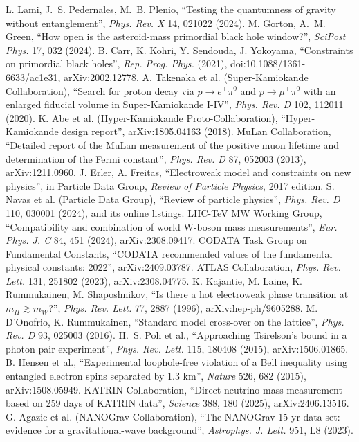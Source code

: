  L. Lami, J.~S. Pedernales, M.~B. Plenio, ``Testing the quantumness of gravity without entanglement'', \emph{Phys. Rev. X} 14,
021022 (2024).
 M. Gorton, A.~M. Green, ``How open is the asteroid-mass primordial black hole window?'', \emph{SciPost Phys.} 17, 032
(2024).
 B. Carr, K. Kohri, Y. Sendouda, J. Yokoyama, ``Constraints on primordial black holes'', \emph{Rep. Prog. Phys.} (2021),
doi:10.1088/1361-6633/ac1e31, arXiv:2002.12778.
 A. Takenaka et al. (Super-Kamiokande Collaboration), ``Search for proton decay via $p\to e^+\pi^0$ and $p\to\mu^+\pi^0$
with an enlarged fiducial volume in Super-Kamiokande I-IV'', \emph{Phys. Rev. D} 102, 112011 (2020).
 K. Abe et al. (Hyper-Kamiokande Proto-Collaboration), ``Hyper-Kamiokande design report'', arXiv:1805.04163 (2018).
 MuLan Collaboration, ``Detailed report of the MuLan measurement of the positive muon lifetime and determination of the
Fermi constant'', \emph{Phys. Rev. D} 87, 052003 (2013), arXiv:1211.0960.
 J. Erler, A. Freitas, ``Electroweak model and constraints on new physics'', in Particle Data Group, \emph{Review of
Particle Physics}, 2017 edition.
 S. Navas et al. (Particle Data Group), ``Review of particle physics'', \emph{Phys. Rev. D} 110, 030001 (2024), and its
online listings.
 LHC-TeV MW Working Group, ``Compatibility and combination of world W-boson mass measurements'', \emph{Eur. Phys. J. C}
84, 451 (2024), arXiv:2308.09417.
 CODATA Task Group on Fundamental Constants, ``CODATA recommended values of the fundamental physical constants: 2022'',
arXiv:2409.03787.
 ATLAS Collaboration, \emph{Phys. Rev. Lett.} 131, 251802 (2023), arXiv:2308.04775.
 K. Kajantie, M. Laine, K. Rummukainen, M. Shaposhnikov, ``Is there a hot electroweak phase transition at
$m_H\gtrsim m_W$?'', \emph{Phys. Rev. Lett.} 77, 2887 (1996), arXiv:hep-ph/9605288.
 M. D'Onofrio, K. Rummukainen, ``Standard model cross-over on the lattice'', \emph{Phys. Rev. D} 93, 025003 (2016).
 H.~S. Poh et al., ``Approaching Tsirelson's bound in a photon pair experiment'', \emph{Phys. Rev. Lett.} 115, 180408
(2015), arXiv:1506.01865.
 B. Hensen et al., ``Experimental loophole-free violation of a Bell inequality using entangled electron spins separated
by 1.3 km'', \emph{Nature} 526, 682 (2015), arXiv:1508.05949.
 KATRIN Collaboration, ``Direct neutrino-mass measurement based on 259 days of KATRIN data'', \emph{Science} 388, 180
(2025), arXiv:2406.13516.
 G. Agazie et al. (NANOGrav Collaboration), ``The NANOGrav 15 yr data set: evidence for a gravitational-wave
background'', \emph{Astrophys. J. Lett.} 951, L8 (2023).
